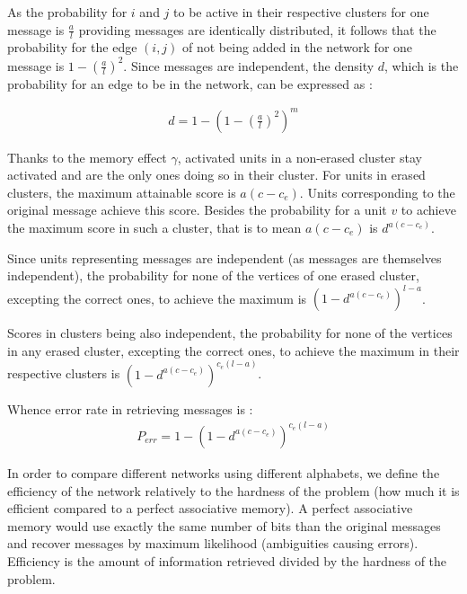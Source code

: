 \documentclass[english,11pt,twocolumn]{IEEEtran}
\theoremstyle{definition}
\begin{document}
	As the probability for $i$ and $j$ to be active in their respective clusters for one message is $\frac{a}{l}$ providing messages are identically distributed, it follows that the probability for the edge $(i,j)$ of not being added in the network for one message is $1 - \left(\frac{a}{l}\right)^2$. Since messages are independent, the density $d$, which is the probability for an edge to be in the network, can be expressed as :
	
	\begin{align}
		\label{formula_density}
		d = 1 - \left( 1 - \left(\frac{a}{l}\right)^2 \right)^m 
	\end{align}		
	
	Thanks to the memory effect $\gamma$, activated units in a non-erased cluster stay activated and are the only ones doing so in their cluster. For units in erased clusters, the maximum attainable score is $a(c - c_e)$. Units corresponding to the original message achieve this score. Besides the probability for a unit $v$ to achieve the maximum score in such a cluster, that is to mean $a(c-c_e)$ is $d^{a(c-c_e)}$.
	
	
	Since units representing messages are independent (as messages are themselves independent), the probability for none of the vertices of one erased cluster, excepting the correct ones, to achieve the maximum is $\left(1 - d^	{a(c-c_e)}\right)^{l-a}$.
	
	Scores in clusters being also independent, the probability for none of the vertices in any erased cluster, excepting the correct ones, to achieve the maximum in their respective clusters is $\left(1 - d^	{a(c-c_e)}\right)^{c_e(l-a)}$.
	
	Whence error rate in retrieving messages is : 
	\begin{align}	
	P_{err} = 1 -	\left(1 - d^	{a(c-c_e)}\right)^{c_e(l-a)} 
	\end{align}	 
	
	In order to compare different networks using different alphabets, we define the efficiency of the network relatively to the hardness of the problem (how much it is efficient compared to a perfect associative memory). A perfect associative memory would use exactly the same number of bits than the original messages and recover messages by maximum likelihood (ambiguities causing errors). Efficiency is the amount of information retrieved divided by the hardness of the problem.
	
\end{document}
